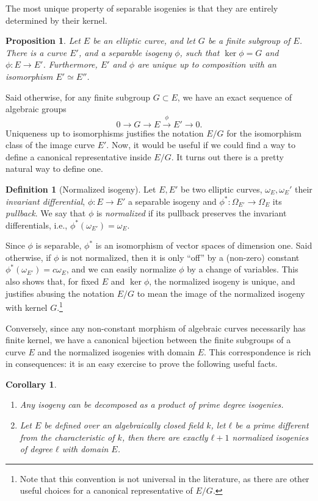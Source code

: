 \documentclass{report}
\theoremstyle{plain}
\newtheorem{corollary}[theorem]{Corollary}
\newtheorem{proposition}[theorem]{Proposition}
\theoremstyle{definition}
\newtheorem{definition}[theorem]{Definition}
\begin{document}
The most unique property of separable isogenies is that they are 
entirely determined by their kernel. %

\begin{proposition}
  Let $E$ be an elliptic curve, and let $G$ be a finite subgroup of
  $E$. %
  There is a curve $E'$, and a separable isogeny $ϕ$, such that
  $\ker ϕ=G$ and $ϕ:E→ E'$. %
  Furthermore, $E'$ and $ϕ$ are unique up to composition with an
  isomorphism $E'≃E''$. %
\end{proposition}

Said otherwise, for any finite subgroup $G⊂E$, we have an exact
sequence of algebraic groups
\begin{equation*}
  0 → G → E \overset{ϕ}{→} E' → 0.
\end{equation*}
Uniqueness up to isomorphisms justifies the notation $E/G$ for the
isomorphism class of the image curve $E'$. %
Now, it would be useful if we could find a way to define a canonical
representative inside $E/G$. %
It turns out there is a pretty natural way to define one.

\begin{definition}[Normalized isogeny]
  Let $E,E'$ be two elliptic curves, $ω_E,ω_E'$ their \emph{invariant
    differential}, $ϕ:E→ E'$ a separable isogeny and
  $ϕ^*:Ω_{E'}→ Ω_E$ its \emph{pullback}. %
  We say that $ϕ$ is \emph{normalized} if its pullback preserves the
  invariant differentials, i.e., $ϕ^*(ω_{E'})=ω_E$. %
\end{definition}

Since $ϕ$ is separable, $ϕ^*$ is an isomorphism of vector spaces of
dimension one. %
Said otherwise, if $ϕ$ is not normalized, then it is only ``off'' by a
(non-zero) constant $ϕ^*(ω_{E'})=cω_E$, and we can easily normalize
$ϕ$ by a change of variables. %
This also shows that, for fixed $E$ and $\ker ϕ$, the normalized
isogeny is unique, and justifies abusing the notation $E/G$ to mean
the image of the normalized isogeny with kernel $G$.\footnote{Note
  that this convention is not universal in the literature, as there
  are other useful choices for a canonical representative of $E/G$.}

Conversely, since any non-constant morphism of algebraic curves
necessarily has finite kernel, we have a canonical bijection between
the finite subgroups of a curve $E$ and the normalized isogenies with
domain $E$. %
This correspondence is rich in consequences: it is an easy exercise to
prove the following useful facts. %

\begin{corollary}\ 
  \begin{enumerate}
  \item Any isogeny can be decomposed as a product of prime degree
    isogenies.
  \item Let $E$ be defined over an algebraically closed field $k$, let
    $ℓ$ be a prime different from the characteristic of $k$, then
    there are exactly $ℓ+1$ normalized isogenies of degree $ℓ$ with
    domain $E$.
  \end{enumerate}
\end{corollary}
\end{document}
